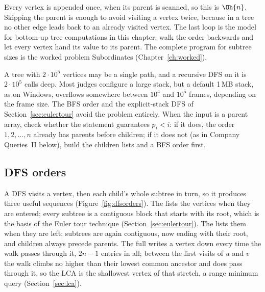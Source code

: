 Every vertex is appended once, when its parent is scanned, so this is $\Oh{n}$. Skipping the parent is enough to avoid visiting a
vertex twice, because in a tree no other edge leads back to an already visited vertex. The last loop is the model for bottom-up tree computations in this
chapter: walk the order backwards and let every vertex hand its value to its parent. The complete program for subtree sizes is the
worked problem Subordinates (Chapter~\ref{ch:worked}).

\begin{pitfall}
A tree with $2 \cdot 10^5$ vertices may be a single path, and a recursive DFS on it is $2 \cdot 10^5$ calls deep. Most judges
configure a large stack, but a default 1\,MB stack, as on Windows, overflows somewhere between $10^4$ and $10^5$ frames,
depending on the frame size. The BFS order and the explicit-stack DFS of Section~\ref{sec:eulertour} avoid the problem entirely. When the input is a parent array,
check whether the statement guarantees $p_i < i$: if it does, the order $1, 2, \dots, n$ already has parents before children;
if it does not (as in Company Queries~II below), build the children lists and a BFS order first.
\end{pitfall}

\subsection{DFS orders}

A DFS visits a vertex, then each child's whole subtree in turn, so it produces three useful sequences (Figure~\ref{fig:dfsorders}).
The  lists the vertices when they are entered; every subtree is a contiguous block that starts with its root, which
is the basis of the Euler tour technique (Section~\ref{sec:eulertour}). The  lists them when they are left; subtrees
are again contiguous, now ending with their root, and children always precede parents. The full  writes a vertex
down every time the walk passes through it, $2n - 1$ entries in all; between the first visits of $u$ and $v$ the walk climbs no
higher than their lowest common ancestor and does pass through it, so the LCA is the shallowest vertex of that stretch, a range
minimum query (Section~\ref{sec:lca}).

